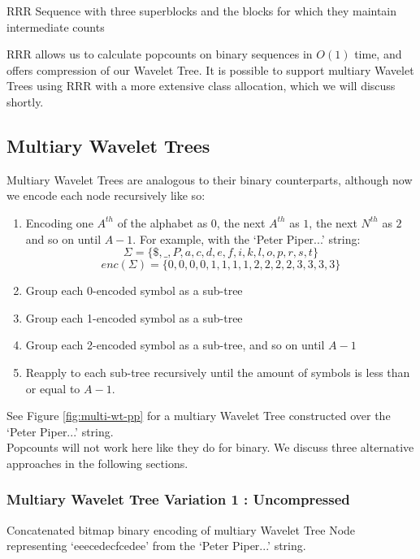 		{RRR Sequence with three superblocks and the blocks for which they
		maintain intermediate counts}

RRR allows us to calculate popcounts on binary sequences in $O(1)$ time, and 
offers compression of our Wavelet Tree. It is possible to support multiary 
Wavelet Trees using RRR with a more extensive class allocation, which we will 
discuss shortly.

\clearpage
\subsection{Multiary Wavelet Trees}
Multiary Wavelet Trees are analogous to their binary counterparts, although now we encode each node recursively like so:

\begin{enumerate}
    \item Encoding one $A^{th}$ of the alphabet as $0$, the next $A^{th}$ as 
		$1$, the next $N^{th}$ as $2$ and so on until $A-1$. For example, with 
		the `Peter Piper...' string:
		$$\Sigma = \{ \$, \_, P, a, c, d, e, f, i, k, l, o, p, r, s, t \}$$
	   	$$enc(\Sigma) = \{  0,  0, 0, 0, 1, 1, 1, 1, 2, 2, 2, 2, 3, 3, 3, 3 \}$$
    \item Group each 0-encoded symbol as a sub-tree
    \item Group each 1-encoded symbol as a sub-tree
    \item Group each 2-encoded symbol as a sub-tree, and so on until $A-1$
    \item Reapply to each sub-tree recursively until the amount of symbols is
	less than or equal to $A - 1$.
\end{enumerate}

See Figure \ref{fig:multi-wt-pp} for a multiary Wavelet Tree constructed over
the `Peter Piper...' string.\\

Popcounts will not work here like they do for binary. We discuss three 
alternative approaches in the following sections.

\subsubsection{Multiary Wavelet Tree Variation 1 : Uncompressed}
		{Concatenated bitmap binary encoding of multiary Wavelet Tree Node
		representing `eeecedecfcedee' from the `Peter Piper...' string.}
		
